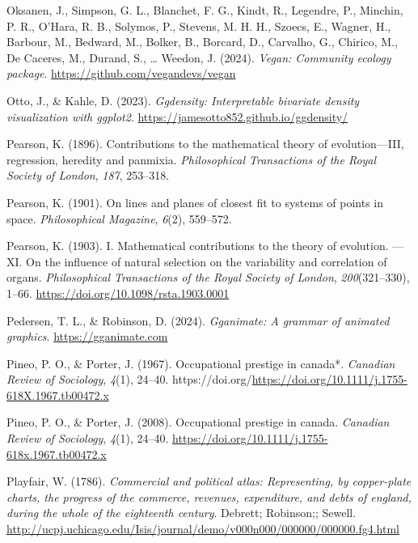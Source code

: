 \documentclass[
  letterpaper,
  10pt,
  krantz2]{krantz}
\newlength{\cslhangindent}
\newenvironment{CSLReferences}[2] %
 {\begin{list}{}{%
  \setlength{\itemindent}{0pt}
  \setlength{\leftmargin}{0pt}
  \setlength{\parsep}{0pt}
  \ifodd #1
   \setlength{\leftmargin}{\cslhangindent}
   \setlength{\itemindent}{-1\cslhangindent}
  \fi
  \setlength{\itemsep}{#2\baselineskip}}}
 {\end{list}}
\begin{document}
\begin{CSLReferences}{1}{0}
Oksanen, J., Simpson, G. L., Blanchet, F. G., Kindt, R., Legendre, P.,
Minchin, P. R., O'Hara, R. B., Solymos, P., Stevens, M. H. H., Szoecs,
E., Wagner, H., Barbour, M., Bedward, M., Bolker, B., Borcard, D.,
Carvalho, G., Chirico, M., De Caceres, M., Durand, S., \ldots{} Weedon,
J. (2024). \emph{Vegan: Community ecology package}.
\url{https://github.com/vegandevs/vegan}

Otto, J., \& Kahle, D. (2023). \emph{Ggdensity: Interpretable bivariate
density visualization with ggplot2}.
\url{https://jamesotto852.github.io/ggdensity/}

Pearson, K. (1896). Contributions to the mathematical theory of
evolution---{III}, regression, heredity and panmixia.
\emph{Philosophical Transactions of the Royal Society of London},
\emph{187}, 253--318.

Pearson, K. (1901). On lines and planes of closest fit to systems of
points in space. \emph{Philosophical Magazine}, \emph{6}(2), 559--572.

Pearson, K. (1903). I. Mathematical contributions to the theory of
evolution. ---XI. On the influence of natural selection on the
variability and correlation of organs. \emph{Philosophical Transactions
of the Royal Society of London}, \emph{200}(321--330), 1--66.
\url{https://doi.org/10.1098/rsta.1903.0001}

Pedersen, T. L., \& Robinson, D. (2024). \emph{Gganimate: A grammar of
animated graphics}. \url{https://gganimate.com}

Pineo, P. O., \& Porter, J. (1967). Occupational prestige in canada*.
\emph{Canadian Review of Sociology}, \emph{4}(1), 24--40.
https://doi.org/\url{https://doi.org/10.1111/j.1755-618X.1967.tb00472.x}

Pineo, P. O., \& Porter, J. (2008). Occupational prestige in canada.
\emph{Canadian Review of Sociology}, \emph{4}(1), 24--40.
\url{https://doi.org/10.1111/j.1755-618x.1967.tb00472.x}

Playfair, W. (1786). \emph{Commercial and political atlas: Representing,
by copper-plate charts, the progress of the commerce, revenues,
expenditure, and debts of england, during the whole of the eighteenth
century}. Debrett; Robinson;; Sewell.
\url{http://ucpj.uchicago.edu/Isis/journal/demo/v000n000/000000/000000.fg4.html}


\end{CSLReferences}
\end{document}
